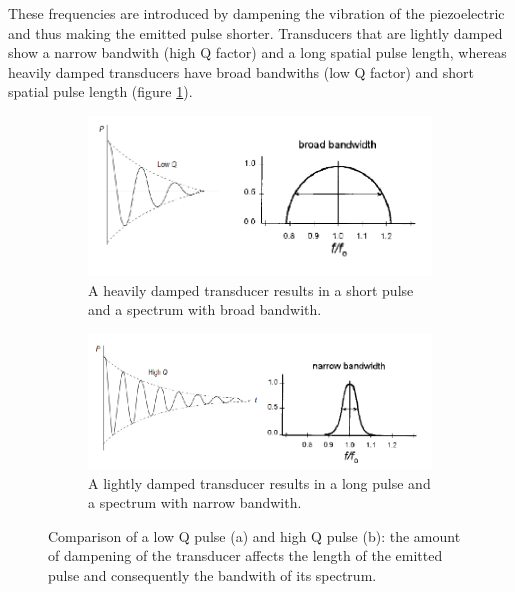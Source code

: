 \documentclass[12pt]{article} %
\begin{document}
These frequencies are introduced by dampening the vibration of the piezoelectric and thus making the emitted pulse shorter. Transducers that are lightly damped show a  narrow bandwith (high Q factor) and a long spatial pulse length, whereas heavily damped transducers have broad bandwiths (low Q factor) and short spatial pulse length (figure \ref{pulse}). 

\begin{figure}[h]
\centering

\begin{subfigure}[b]{0.49\textwidth}
\centering
\includegraphics[width=\textwidth]{figuras/lowq.png}
\caption{\footnotesize A heavily damped transducer results in a short pulse and a  spectrum with broad bandwith.}
\end{subfigure}
\begin{subfigure}[b]{0.49\textwidth}
\centering
\includegraphics[width=\textwidth]{figuras/highq.png}
\caption{\footnotesize A lightly damped transducer results in a long pulse 				and a spectrum with narrow bandwith.}
\end{subfigure}	

\caption{\small Comparison of a low Q pulse (a) and high Q pulse (b): the amount of dampening of the transducer affects the length of the emitted pulse and consequently the bandwith of its spectrum. \cite{bushberg}\cite{farr}}
\label{pulse}	
\end{figure}
\end{document}
